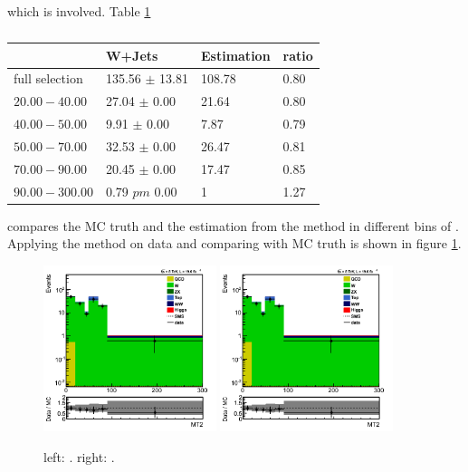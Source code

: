 which is involved. Table \ref{tbl:LepTauEstimationClosure}
\begin{table}
\begin{center}
\begin{tiny}
\begin{tabular}{llll}
\hline
\hline
               &  W+Jets& Estimation & ratio\\
\hline
\hline
full selection &  135.56 $\pm$ 13.81 & 108.78    & 0.80 \\
$20.00-40.00$  &  27.04 $\pm$ 0.00   & 21.64     & 0.80 \\
$40.00-50.00$  &  9.91 $\pm$ 0.00    & 7.87      & 0.79 \\
$50.00-70.00$  &  32.53 $\pm$ 0.00   & 26.47     & 0.81 \\
$70.00-90.00$  &  20.45 $\pm$ 0.00   & 17.47     & 0.85 \\
$90.00-300.00$ &  0.79 $pm$ 0.00    & 1         & 1.27\\
\hline
\hline
\end{tabular}
\caption{}
\label{tbl:LepTauEstimationClosure}
\end{tiny}
\end{center}
\end{table}
compares the MC truth and the estimation from the method in different bins of \mttwo. Applying the method on data and comparing with MC truth is 
shown in figure \ref{fig:LepTauEstimationData}.
\begin{figure}[!Hhtb]
\centering
\includegraphics[width=0.45\textwidth,keepaspectratio=true]{FakeRateMuTau/Estimation_ExtraLepExcl_SameSignWeightedHiggs.png}
\includegraphics[width=0.45\textwidth,keepaspectratio=true]{FakeRateMuTau/Estimation_ExtraLepExcl_SameSignWeightedHiggs.png}
\caption{left: . right: .}
\label{fig:LepTauEstimationData}
\end{figure}
